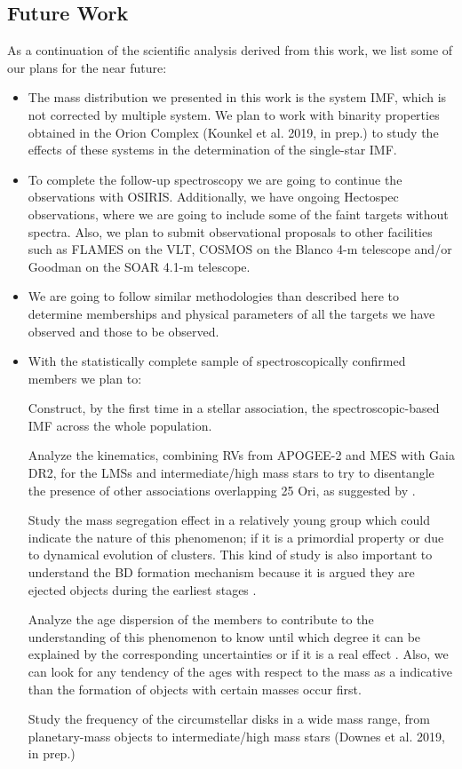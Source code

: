 \documentclass[12pt]{article}
\begin{document}
\subsection{Future Work}
As a continuation of the scientific analysis derived from this work, we list some of our plans for the near future:

\begin{itemize}
	\item The mass distribution we presented in this work is the system IMF, which is not corrected by multiple system. We plan to work with binarity properties obtained in the Orion Complex (Kounkel et al. 2019, in prep.) to study the effects of these systems in the determination of the single-star IMF.
	\item To complete the follow-up spectroscopy we are going to continue the observations with OSIRIS. Additionally, we have ongoing Hectospec observations, where we are going to include some of the faint targets without spectra. Also, we plan to submit observational proposals to other facilities such as FLAMES on the VLT, COSMOS on the Blanco 4-m telescope and/or Goodman on the SOAR 4.1-m telescope. 
	\item We are going to follow similar methodologies than described here to determine memberships and physical parameters of all the targets we have observed and those to be observed.
	\item With the statistically complete sample of spectroscopically confirmed members we plan to: \par
		Construct, by the first time in a stellar association, the spectroscopic-based IMF across the whole population. \par
		Analyze the kinematics, combining RVs from APOGEE-2 and MES with Gaia DR2, for the LMSs and intermediate/high mass stars to try to disentangle the presence of other associations overlapping 25 Ori, as suggested by \citet{Kounkel2018,Briceno2018}. \par
		Study the mass segregation effect in a relatively young group which could indicate the nature of this phenomenon; if it is a primordial property \citep{Bonnell-Davies1998,Bonnell2001} or due to dynamical evolution \citep{Kroupa2001a,Kroupa2001b} of clusters. This kind of study is also important to understand the BD formation mechanism because it is argued they are ejected objects during the earliest stages \citep{Reipurth-Clarke2001}. \par
		Analyze the age dispersion of the members to contribute to the understanding of this phenomenon to know until which degree it can be explained by the corresponding uncertainties or if it is a real effect \citep{Palla-Stahler1999}. Also, we can look for any tendency of the ages with respect to the mass as a indicative than the formation of objects with certain masses occur first. \par
		Study the frequency of the circumstellar disks in a wide mass range, from planetary-mass objects to intermediate/high mass stars (Downes et al. 2019, in prep.)
\end{itemize}
\end{document}
